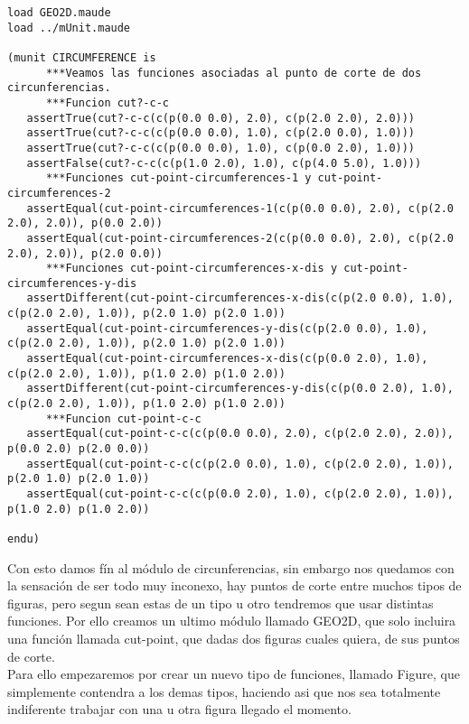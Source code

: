 \documentclass[12pt,a4paper]{book}
\begin{document}
\begin{verbatim}
load GEO2D.maude
load ../mUnit.maude

(munit CIRCUMFERENCE is 
      ***Veamos las funciones asociadas al punto de corte de dos circunferencias.
      ***Funcion cut?-c-c
   assertTrue(cut?-c-c(c(p(0.0 0.0), 2.0), c(p(2.0 2.0), 2.0)))
   assertTrue(cut?-c-c(c(p(0.0 0.0), 1.0), c(p(2.0 0.0), 1.0)))
   assertTrue(cut?-c-c(c(p(0.0 0.0), 1.0), c(p(0.0 2.0), 1.0)))
   assertFalse(cut?-c-c(c(p(1.0 2.0), 1.0), c(p(4.0 5.0), 1.0)))
      ***Funciones cut-point-circumferences-1 y cut-point-circumferences-2
   assertEqual(cut-point-circumferences-1(c(p(0.0 0.0), 2.0), c(p(2.0 2.0), 2.0)), p(0.0 2.0))
   assertEqual(cut-point-circumferences-2(c(p(0.0 0.0), 2.0), c(p(2.0 2.0), 2.0)), p(2.0 0.0))
      ***Funciones cut-point-circumferences-x-dis y cut-point-circumferences-y-dis
   assertDifferent(cut-point-circumferences-x-dis(c(p(2.0 0.0), 1.0), c(p(2.0 2.0), 1.0)), p(2.0 1.0) p(2.0 1.0))
   assertEqual(cut-point-circumferences-y-dis(c(p(2.0 0.0), 1.0), c(p(2.0 2.0), 1.0)), p(2.0 1.0) p(2.0 1.0))
   assertEqual(cut-point-circumferences-x-dis(c(p(0.0 2.0), 1.0), c(p(2.0 2.0), 1.0)), p(1.0 2.0) p(1.0 2.0))
   assertDifferent(cut-point-circumferences-y-dis(c(p(0.0 2.0), 1.0), c(p(2.0 2.0), 1.0)), p(1.0 2.0) p(1.0 2.0))
      ***Funcion cut-point-c-c
   assertEqual(cut-point-c-c(c(p(0.0 0.0), 2.0), c(p(2.0 2.0), 2.0)), p(0.0 2.0) p(2.0 0.0))
   assertEqual(cut-point-c-c(c(p(2.0 0.0), 1.0), c(p(2.0 2.0), 1.0)), p(2.0 1.0) p(2.0 1.0))
   assertEqual(cut-point-c-c(c(p(0.0 2.0), 1.0), c(p(2.0 2.0), 1.0)), p(1.0 2.0) p(1.0 2.0))

endu)

\end{verbatim}

Con esto damos f\'in al m\'odulo de circunferencias, sin embargo nos quedamos con la sensaci\'on de ser todo muy inconexo, hay puntos de corte entre muchos tipos de figuras, pero segun sean estas de un tipo u otro tendremos que usar distintas funciones. Por ello creamos un ultimo m\'odulo llamado GEO2D, que solo incluira una funci\'on llamada cut-point, que dadas dos figuras cuales quiera, de sus puntos de corte. \\

Para ello empezaremos por crear un nuevo tipo de funciones, llamado Figure, que simplemente contendra a los demas tipos, haciendo asi que nos sea totalmente indiferente trabajar con una u otra figura llegado el momento.\par
\end{document}
